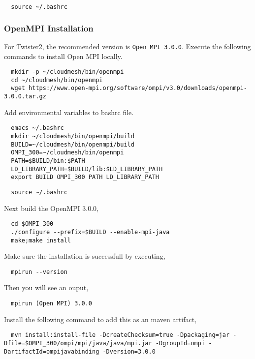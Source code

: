 \begin{lstlisting}
  source ~/.bashrc
\end{lstlisting}

\subsubsection{OpenMPI Installation}\label{s:s:twister2-openmpi}

For Twister2, the recommended version is \verb|Open MPI 3.0.0|.
Execute the following commands to install Open MPI locally. 

\begin{lstlisting}
  mkdir -p ~/cloudmesh/bin/openmpi
  cd ~/cloudmesh/bin/openmpi
  wget https://www.open-mpi.org/software/ompi/v3.0/downloads/openmpi-3.0.0.tar.gz  
\end{lstlisting}

Add environmental variables to bashrc file.

\begin{lstlisting}
  emacs ~/.bashrc
  mkdir ~/cloudmesh/bin/openmpi/build
  BUILD=~/cloudmesh/bin/openmpi/build
  OMPI_300=~/cloudmesh/bin/openmpi
  PATH=$BUILD/bin:$PATH
  LD_LIBRARY_PATH=$BUILD/lib:$LD_LIBRARY_PATH
  export BUILD OMPI_300 PATH LD_LIBRARY_PATH
\end{lstlisting}

\begin{lstlisting}
  source ~/.bashrc
\end{lstlisting}

Next build the OpenMPI 3.0.0,

\begin{lstlisting}
  cd $OMPI_300
  ./configure --prefix=$BUILD --enable-mpi-java
  make;make install
\end{lstlisting}

Make sure the installation is successfull by executing,

\begin{lstlisting}
  mpirun --version
\end{lstlisting}

Then you will see an ouput,

\begin{lstlisting}
  mpirun (Open MPI) 3.0.0
\end{lstlisting}

Install the following command to add this as an maven artifact,

\begin{lstlisting}
  mvn install:install-file -DcreateChecksum=true -Dpackaging=jar -Dfile=$OMPI_300/ompi/mpi/java/java/mpi.jar -DgroupId=ompi -DartifactId=ompijavabinding -Dversion=3.0.0
\end{lstlisting}


